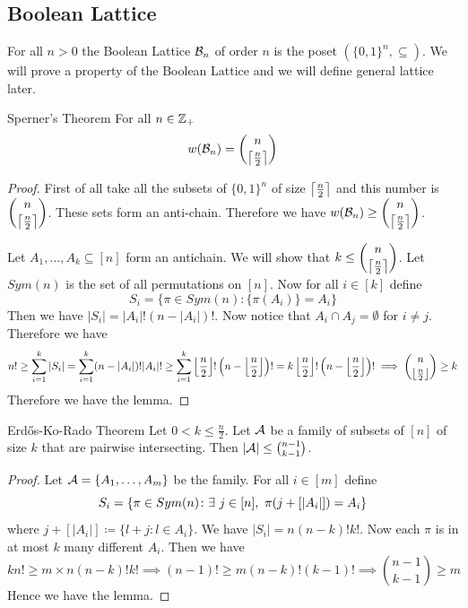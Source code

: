 \subsection{Boolean Lattice}
For all $n>0$ the Boolean Lattice $\mathcal{B}_n$ of order $n$ is the poset $(\{0,1\}^n,\subseteq)$. We will prove a property of the Boolean Lattice and we will define general lattice later.
\begin{Theorem}{Sperner's Theorem}{}
	For all $n\in \mathbb{Z}_+$ $$w(\mathcal{B}_n)=\binom{n}{\left\lceil\frac{n}2\right\rceil}$$
\end{Theorem}
\begin{proof}
	First of all take all the subsets of $\{0,1\}^n$ of size $\left\lceil\frac{n}2\right\rceil$ and this number is $\displaystyle{\binom{n}{\left\lceil\frac{n}2\right\rceil}}$. These sets form an anti-chain. Therefore we have $w(\mathcal{B}_n)\geq \displaystyle{\binom{n}{\left\lceil\frac{n}2\right\rceil}}$.
	
	Let $A_1,\dots, A_k\subseteq [n]$ form an antichain. We will show that $k\leq \displaystyle{\binom{n}{\left\lceil\frac{n}2\right\rceil}}$.	Let $Sym(n)$ is the set of all permutations on $[n]$. Now for all $i\in[k]$ define $$S_i=\{\pi\in Sym(n)\colon \{\pi(A_i)\}=A_i\}$$Then we have $|S_i|=|A_i|!(n-|A_i|)!$. Now notice that $A_i\cap A_j=\emptyset$ for $i\neq j$. Therefore we have $$n!\geq\sum_{i=1}^k|S_i|=\sum_{i=1}^k(n-|A_i|)!|A_i|!\geq \sum_{i=1}^k\left\lfloor\frac{n}2\right\rfloor!\left(n-\left\lfloor\frac{n}2\right\rfloor\right)!=k\left\lfloor\frac{n}2\right\rfloor!\left(n-\left\lfloor\frac{n}2\right\rfloor\right)!\implies \binom{n}{\left\lfloor\frac{n}2\right\rfloor}\geq k$$Therefore we have the lemma.
\end{proof}
\begin{Theorem}{Erd\H{o}s-Ko-Rado Theorem}{}
	Let $0<k\leq \frac{n}{2}$. Let $\mathcal{A}$ be a family of   subsets of $[n]$ of size $k$ that are pairwise intersecting. Then $|\mathcal{A}|\leq \binom{n-1}{k-1}$.
\end{Theorem}
\begin{proof}
	Let $\mathcal{A}=\{A_1,\dots, A_m\}$ be the family. For all $i\in[m]$ define $$S_i=\{\pi\in Sym(n)\colon \exs\ j\in[n],\ \pi(j+[|A_i|])=A_i\}$$where $j+[|A_i|]\coloneqq \{l+j\colon l\in A_i\}$. We have $|S_i|=n(n-k)!k!$. Now each $\pi$ is in at most $k$ many different $A_i$. Then we have $$kn!\geq m\times n(n-k)!k!\implies (n-1)!\geq m(n-k)!(k-1)!\implies \binom{n-1}{k-1}\geq m$$Hence we have the lemma.
\end{proof}
